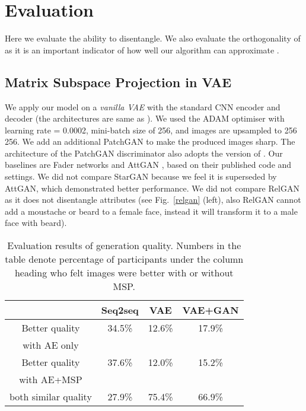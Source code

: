 \documentclass{article}
\begin{document}
\section{Evaluation}\label{eval}


Here we evaluate  the ability to disentangle. We  also evaluate the orthogonality of   as it is an important indicator  of how well our algorithm can approximate . 





\subsection{Matrix Subspace Projection in VAE}\label{se:model_vae}

We apply our model on a \textit{vanilla VAE} \cite{kingma2013auto} with the standard CNN encoder and decoder (the architectures are same as \citet{NIPS2017_7178}).
We used the ADAM optimiser with learning rate = 0.0002, mini-batch size of 256, and images are upsampled to 256  256.
We add an additional  PatchGAN \cite{li2016precomputed} to make the produced images sharp. The architecture of the PatchGAN discriminator also adopts the version of \citet{NIPS2017_7178}. 
Our baselines are Fader networks \cite{NIPS2017_7178} and
AttGAN  \cite{attgan}, based on their published code and settings.
We did not compare StarGAN \cite{StarGAN} because we feel it is superseded by AttGAN, which demonstrated better performance.
We did not compare RelGAN \cite{relGAN} as it does not disentangle attributes (see Fig.~\ref{relgan} (left), also RelGAN cannot add a moustache or beard to a female face, instead it will transform it to a male face with beard). 


\begin{table}[tb]
\begin{center}
\begin{tabular}{|c|c|c|c|}
\hline
&	Seq2seq	&	VAE	&	VAE+GAN	\\ \hline
Better quality &	34.5\%	&	12.6\%	&	17.9\%\\
with AE only&&&		\\ \hline
Better quality	&	37.6\%	&	12.0\%	&	15.2\%	\\ 
with  AE+MSP&&&		\\ \hline
both similar quality	&	27.9\%	&	75.4\%	&	66.9\%	\\ \hline
\end{tabular}
\end{center}
\caption{Evaluation results of generation quality. Numbers in the table denote percentage of participants under the column heading who felt images were better with or without MSP. 
}
\small
\label{tab:evalu1}
\end{table}
\end{document}
